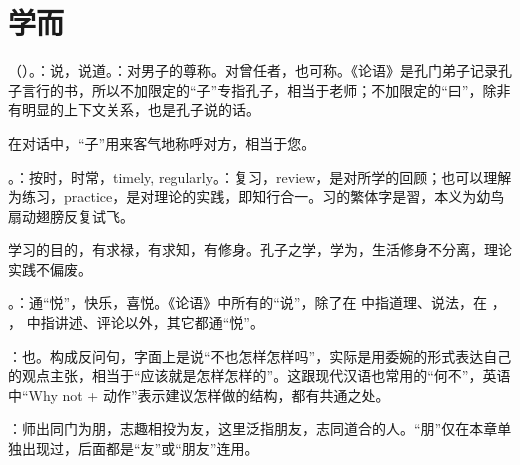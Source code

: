 \chapter{学而}

{
\item {}（）。：说，说道。：对男子的尊称。对曾任者，也可称。《论语》是孔门弟子记录孔子言行的书，所以不加限定的“子”专指孔子，相当于老师；不加限定的“曰”，除非有明显的上下文关系，也是孔子说的话。

在对话中，“子”用来客气地称呼对方，相当于您。
\item {}。：按时，时常，timely, regularly。：复习，review，是对所学的回顾；也可以理解为练习，practice，是对理论的实践，即知行合一。习的繁体字是習，本义为幼鸟扇动翅膀反复试飞。

学习的目的，有求禄，有求知，有修身。孔子之学，学为，生活修身不分离，理论实践不偏废。

\item {}。：通“悦”，快乐，喜悦。《论语》中所有的“说”，除了在  中指道理、说法，在  ， ， 中指讲述、评论以外，其它都通“悦”。

：也。构成反问句，字面上是说“不也怎样怎样吗”，实际是用委婉的形式表达自己的观点主张，相当于“应该就是怎样怎样的”。这跟现代汉语也常用的“何不”，英语中“Why not + 动作”表示建议怎样做的结构，都有共通之处。
\item {}：师出同门为朋，志趣相投为友，这里泛指朋友，志同道合的人。“朋”仅在本章单独出现过，后面都是“友”或“朋友”连用。

}
